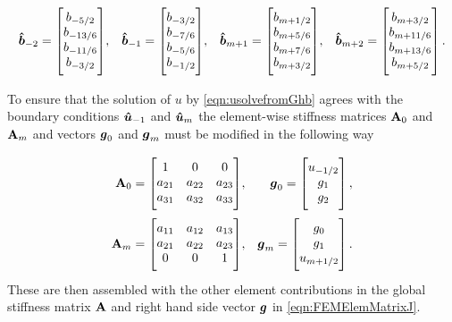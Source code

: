 \begin{align*}
\vecn{\hat{b}}_{-2} = \begin{bmatrix} \TM
b_{-5/2} \\ b_{-13/6} \\ b_{-11/6} \\ b_{-3/2} \BM\end{bmatrix}&, &\vecn{\hat{b}}_{-1} = \begin{bmatrix} \TM
b_{-3/2} \\ b_{-7/6} \\ b_{-5/6} \\ b_{-1/2} \BM\end{bmatrix}&, &\vecn{\hat{b}}_{m+1} = \begin{bmatrix} \TM
b_{m+1/2} \\ b_{m+5/6} \\ b_{m+7/6} \\ b_{m+3/2} \BM\end{bmatrix}&, &\vecn{\hat{b}}_{m+2} = \begin{bmatrix} \TM
b_{m+3/2} \\ b_{m+11/6} \\ b_{m+13/6} \\ b_{m+5/2} \BM\end{bmatrix}.
\end{align*}

To ensure that the solution of $u$ by \eqref{eqn:usolvefromGhb} agrees with the boundary conditions $\boldsymbol{\hat{u}}_{-1}$ and $\boldsymbol{\hat{u}}_{m}$ the element-wise stiffness matrices $\mathbf{A}_0$ and $\mathbf{A}_m$ and vectors $\boldsymbol{g}_0$ and $\boldsymbol{g}_m$ must be modified in the following way 

\begin{align*}
\matr{A}_{0} = 
\begin{bmatrix}
\TM 1 &0 &0 \\
a_{21} & a_{22} & a_{23} \\
a_{31} & a_{32} & a_{33} \BM
\end{bmatrix} &,& \vecn{g}_{0} = \begin{bmatrix}
\TM u_{-1/2} \\
g_1 \\
g_2 \BM
\end{bmatrix},\\
\matr{A}_{m} = 
\begin{bmatrix}
\TM a_{11} & a_{12} & a_{13} \\
a_{21} & a_{22} & a_{23} \\
0 & 0 & 1 \BM
\end{bmatrix} &,& \vecn{g}_{m} = \begin{bmatrix}
\TM g_0\\ 
g_1 \\
u_{m+1/2} \BM
\end{bmatrix}.
\end{align*}
These are then assembled with the other element contributions in the global stiffness matrix $\mathbf{A}$ and right hand side vector $\boldsymbol{g}$ in \eqref{eqn:FEMElemMatrixJ}.

